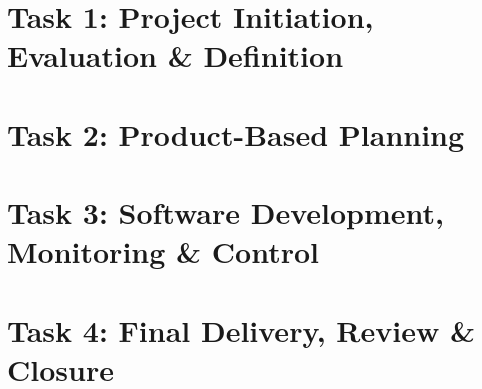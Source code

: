 \documentclass[a4paper]{article}
\theoremstyle{definition}
\begin{document}
\hypersetup{pageanchor=true}




\fontsize{12pt}{15pt}\selectfont


\newpage




\newpage

\tableofcontents


\newpage




\section{Task 1: Project Initiation, Evaluation \& Definition}










\section{Task 2: Product-Based Planning}
















\section{Task 3: Software Development, Monitoring \& Control}
\label{sec:execution-i1}
















\section{Task 4: Final Delivery, Review \& Closure}











\clearpage
\appendix

\end{document}

